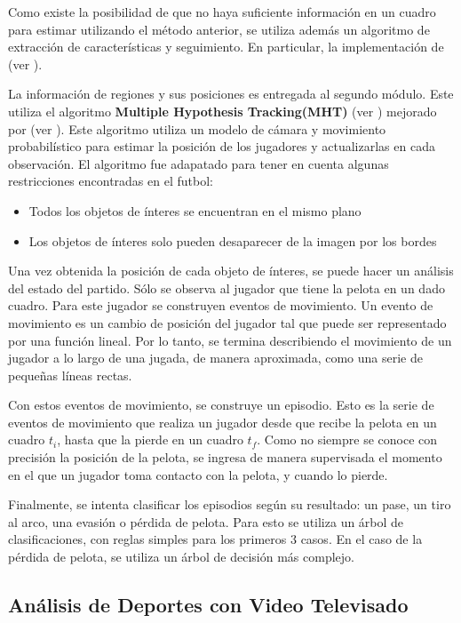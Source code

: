 Como existe la posibilidad de que no haya suficiente información en un cuadro para estimar
utilizando el método anterior, se utiliza además un algoritmo de extracción de características y seguimiento.
En particular, la implementación de \citeauthor{shi-tomasi-tracking} (ver \cite{shi-tomasi-tracking}).

La información de regiones y sus posiciones es entregada al segundo módulo.
Este utiliza el algoritmo \textbf{Multiple Hypothesis Tracking(MHT)} (ver \cite{MHT-1, MHT-2}) mejorado por
\citeauthor*{Schmitt-1} (ver \cite{Schmitt-2}). Este algoritmo utiliza un modelo de cámara y movimiento
probabilístico para estimar la posición de los jugadores y actualizarlas en cada observación.
El algoritmo fue adapatado para tener en cuenta algunas restricciones encontradas en el futbol:
\begin{itemize}
\item Todos los objetos de ínteres se encuentran en el mismo plano
\item Los objetos de ínteres solo pueden desaparecer de la imagen por los bordes
\end{itemize}

Una vez obtenida la posición de cada objeto de ínteres, se puede hacer un análisis del estado del partido.
Sólo se observa al jugador que tiene la pelota en un dado cuadro.
Para este jugador se construyen eventos de movimiento. Un evento de movimiento es un cambio de posición del jugador
tal que puede ser representado por una función lineal. Por lo tanto, se termina describiendo el movimiento de un
jugador a lo largo de una jugada, de manera aproximada, como una serie de pequeñas líneas rectas.

Con estos eventos de movimiento, se construye un episodio. Esto es la serie de eventos de movimiento que realiza
un jugador desde que recibe la pelota en un cuadro $t_i$, hasta que la pierde en un cuadro $t_f$.
Como no siempre se conoce con precisión la posición de la pelota, se ingresa de manera supervisada el momento en el
que un jugador toma contacto con la pelota, y cuando lo pierde.

Finalmente, se intenta clasificar los episodios según su resultado: un pase, un tiro al arco, una evasión o pérdida de pelota.
Para esto se utiliza un árbol de clasificaciones, con reglas simples para los primeros 3 casos.
En el caso de la pérdida de pelota, se utiliza un árbol de decisión más complejo.

\subsection{Análisis de Deportes con Video Televisado}
\label{sec:tv-video}

